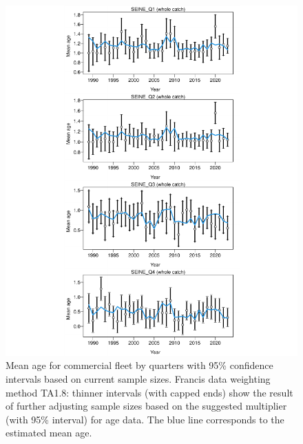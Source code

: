 \documentclass[
]{article}
\begin{document}
\begin{figure}[H]

{\centering \includegraphics[width=0.95\linewidth]{Report_SS3_quarter_with_age_data_MR_prueba_mod_files/figure-latex/unnamed-chunk-16-1} 

}

\caption{Mean age for commercial fleet by quarters with 95\% confidence intervals based on current sample sizes. Francis data weighting method TA1.8: thinner intervals (with capped ends) show the result of further adjusting sample sizes based on the suggested multiplier (with 95\% interval) for age data. The blue line corresponds to the estimated mean age.}\label{fig:unnamed-chunk-16}
\end{figure}
\end{document}
